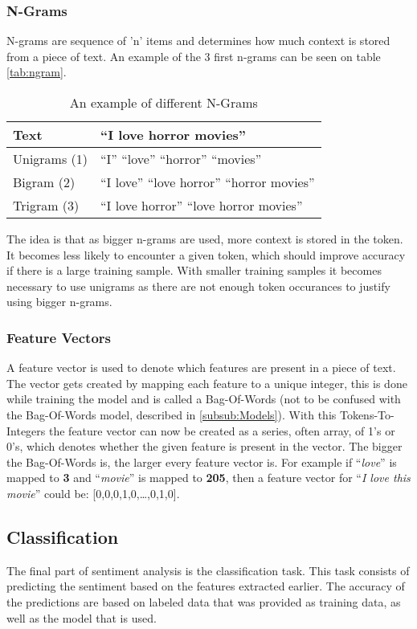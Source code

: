 \subsubsection{N-Grams}
N-grams are sequence of 'n' items and determines how much context is stored
from a piece of text. An example of the 3 first n-grams can be seen on table
\autoref{tab:ngram}. 

\begin{table}[H]
\centering
\begin{tabular}{|l|l|}
\hline
Text & ``I love horror movies'' \\ \hline
Unigrams (1) &
``I'' ``love'' ``horror'' ``movies''
\\ \hline 
Bigram (2) &
``I love'' ``love horror'' ``horror movies''
\\ \hline
Trigram (3) &
``I love horror'' ``love horror movies''
\\ \hline
\end{tabular}
\caption{An example of different N-Grams}
\label{tab:ngram}
\end{table}

The idea is that as bigger n-grams are used, more context is stored in the
token. It becomes less likely to encounter a given token, which should
improve accuracy if there is a large training sample. With smaller training
samples it becomes necessary to use unigrams as there are not enough
token occurances to justify using bigger n-grams.

\subsubsection{Feature Vectors}
A feature vector is used to denote which features are present in a piece of
text. The vector gets created by mapping each feature to a unique integer, this
is done while training the model and is called a Bag-Of-Words (not to be
confused with the Bag-Of-Words model, described in \autoref{subsub:Models}).
With this Tokens-To-Integers the feature vector can now be created as a series,
often array, of 1's or 0's, which denotes whether the given feature is present
in the vector. The bigger the Bag-Of-Words is, the larger every feature vector
is. For example if ``\textit{love}'' is mapped to \textbf{3} and
``\textit{movie}'' is mapped to \textbf{205}, then a feature vector for
``\textit{I love this movie}'' could be: [0,0,0,1,0,\ldots,0,1,0].



\subsection{Classification}
The final part of sentiment analysis is the classification task. This task
consists of predicting the sentiment based on the features extracted earlier.
The accuracy of the predictions are based on labeled data that was provided as
training data, as well as the model that is used. 

